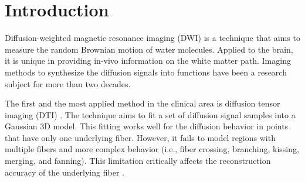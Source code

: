 \documentclass[twoside,twocolumn,10pt]{article}
\begin{document}

\section{Introduction}

\copyrightspace

Diffusion-weighted magnetic resonance imaging (DWI) is a technique that aims to measure the random Brownian motion of water molecules. Applied to the brain, it is unique in providing in-vivo information on the white matter path. Imaging methods to synthesize the diffusion signals into functions have been a research subject for more than two decades.

The first and the most applied method in the clinical area is diffusion tensor imaging (DTI) \cite{Basser1994}. The technique aims to fit a set of diffusion signal samples into a Gaussian 3D model.
This fitting works  well for the diffusion behavior in points that have only one underlying fiber. However, it fails to model regions with multiple fibers and more complex behavior (i.e., fiber crossing, branching, kissing, merging, and fanning). This limitation critically affects the reconstruction accuracy of the underlying fiber \cite{descoteaux2015,SCHILLING2019194}.

\end{document}
